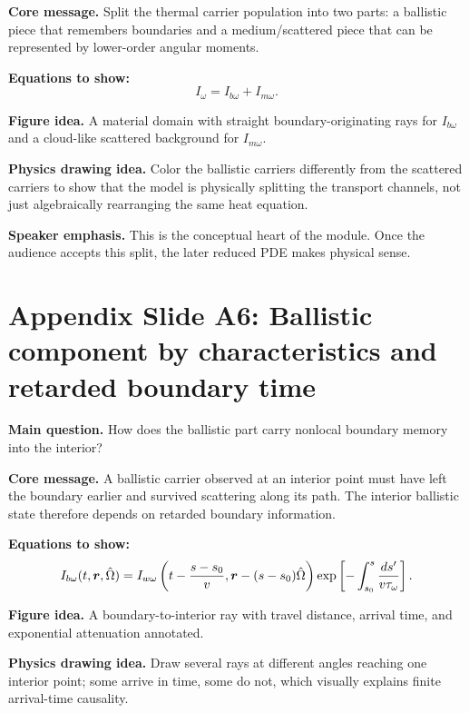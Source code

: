 \documentclass[11pt]{article}
\begin{document}
\textbf{Core message.} Split the thermal carrier population into two parts: a ballistic piece that remembers boundaries and a medium/scattered piece that can be represented by lower-order angular moments.

\textbf{Equations to show:}
\begin{equation*}
I_\omega = I_{b\omega}+I_{m\omega}.
\end{equation*}

\textbf{Figure idea.} A material domain with straight boundary-originating rays for \(I_{b\omega}\) and a cloud-like scattered background for \(I_{m\omega}\).

\textbf{Physics drawing idea.} Color the ballistic carriers differently from the scattered carriers to show that the model is physically splitting the transport channels, not just algebraically rearranging the same heat equation.

\textbf{Speaker emphasis.} This is the conceptual heart of the module. Once the audience accepts this split, the later reduced PDE makes physical sense.

\section{Appendix Slide A6: Ballistic component by characteristics and retarded boundary time}
\begin{physicsbox}
\textbf{Main question.} How does the ballistic part carry nonlocal boundary memory into the interior?
\end{physicsbox}

\textbf{Core message.} A ballistic carrier observed at an interior point must have left the boundary earlier and survived scattering along its path. The interior ballistic state therefore depends on retarded boundary information.

\textbf{Equations to show:}
\begin{equation*}
I_{b\omega}(t,\bm{r},\hat{\Omega})
=I_{w\omega}\left(t-\frac{s-s_0}{v},\bm{r}-(s-s_0)\hat{\Omega}\right)
\exp\left[-\int_{s_0}^{s}\frac{ds'}{v\tau_\omega}\right].
\end{equation*}

\textbf{Figure idea.} A boundary-to-interior ray with travel distance, arrival time, and exponential attenuation annotated.

\textbf{Physics drawing idea.} Draw several rays at different angles reaching one interior point; some arrive in time, some do not, which visually explains finite arrival-time causality.
\end{document}
